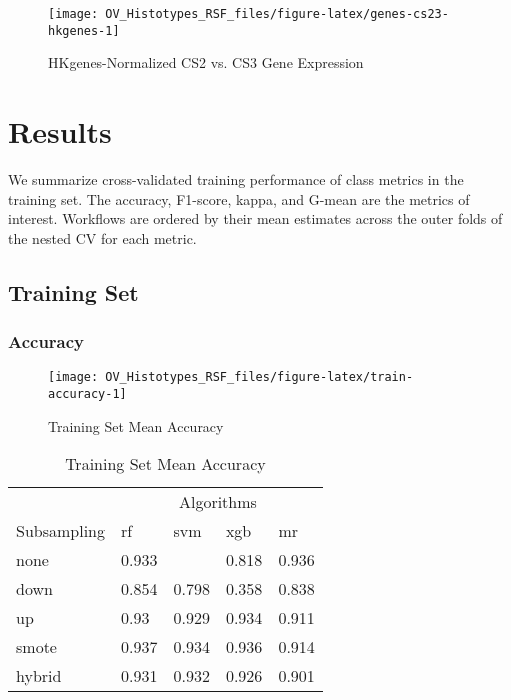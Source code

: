 \documentclass[
]{report}
\begin{document}
\begin{figure}[H]

{\centering \texttt{[image: OV\_Histotypes\_RSF\_files/figure-latex/genes-cs23-hkgenes-1]} 

}

\caption{HKgenes-Normalized CS2 vs. CS3 Gene Expression}\label{fig:genes-cs23-hkgenes}
\end{figure}

\chapter{Results}\label{results}

We summarize cross-validated training performance of class metrics in the training set. The accuracy, F1-score, kappa, and G-mean are the metrics of interest. Workflows are ordered by their mean estimates across the outer folds of the nested CV for each metric.

\section{Training Set}\label{training-set}

\subsection{Accuracy}\label{accuracy-1}

\begin{figure}[H]

{\centering \texttt{[image: OV\_Histotypes\_RSF\_files/figure-latex/train-accuracy-1]} 

}

\caption{Training Set Mean Accuracy}\label{fig:train-accuracy}
\end{figure}

\begin{table}

\caption{\label{tab:train-accuracy-table}Training Set Mean Accuracy}
\centering
\begin{tabular}[t]{l|l|l|l|l}
\hline
\multicolumn{1}{c|}{ } & \multicolumn{4}{c}{Algorithms} \\
\cline{2-5}
Subsampling & rf & svm & xgb & mr\\
\hline
none & 0.933 & \cellcolor[HTML]{90ee90}{0.938} & 0.818 & 0.936\\
\hline
down & 0.854 & 0.798 & 0.358 & 0.838\\
\hline
up & 0.93 & 0.929 & 0.934 & 0.911\\
\hline
smote & 0.937 & 0.934 & 0.936 & 0.914\\
\hline
hybrid & 0.931 & 0.932 & 0.926 & 0.901\\
\hline
\end{tabular}
\end{table}
\end{document}

